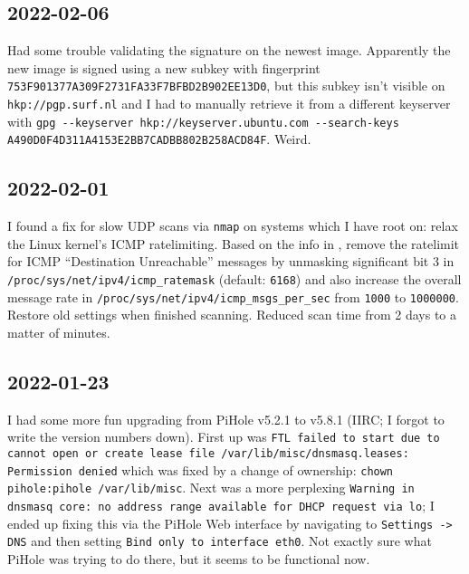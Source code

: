 \documentclass{article}
\begin{document}
\subsection{2022-02-06}
Had some trouble validating the signature on the newest  image.  Apparently the new image is signed using a new subkey with fingerprint \texttt{753F901377A309F2731FA33F7BFBD2B902EE13D0}, but this subkey isn't visible on \texttt{hkp://pgp.surf.nl} and I had to manually retrieve it from a different keyserver with \texttt{gpg \verb|--|keyserver hkp://keyserver.ubuntu.com \verb|--|search-keys A490D0F4D311A4153E2BB7CADBB802B258ACD84F}.  Weird.

\subsection{2022-02-01}
I found a fix for slow UDP scans via \texttt{nmap} on systems which I have root on: relax the Linux kernel's ICMP ratelimiting.  Based on the info in , remove the ratelimit for ICMP ``Destination Unreachable'' messages by unmasking significant bit 3 in \texttt{/proc/sys/net/ipv4/icmp_ratemask} (default: \texttt{6168}) and also increase the overall message rate in \texttt{/proc/sys/net/ipv4/icmp_msgs_per_sec} from \texttt{1000} to \texttt{1000000}.  Restore old settings when finished scanning.  Reduced scan time from 2 days to a matter of minutes.

\subsection{2022-01-23}
I had some more fun upgrading from PiHole v5.2.1 to v5.8.1 (IIRC; I forgot to write the version numbers down).  First up was \texttt{FTL failed to start due to cannot open or create lease file /var/lib/misc/dnsmasq.leases: Permission denied} which was fixed by a change of ownership: \texttt{chown pihole:pihole /var/lib/misc}.  Next was a more perplexing \texttt{Warning in dnsmasq core: no address range available for DHCP request via lo}; I ended up fixing this via the PiHole Web interface by navigating to \texttt{Settings -> DNS} and then setting \texttt{Bind only to interface eth0}.  Not exactly sure what PiHole was trying to do there, but it seems to be functional now.
\end{document}
